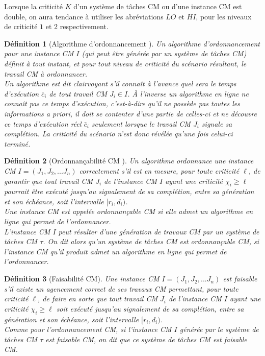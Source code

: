 \documentclass[12pt,a4paper,oneside]{book}
\theoremstyle{break}
\newtheorem{defin}{Définition}[chapter]
\theoremstyle{breakplain}
\begin{document}
Lorsque la criticité $K$ d'un système de tâches CM ou d'une instance CM est double, on aura tendance à utiliser les abréviations $LO$ et $HI$, pour les niveaux de criticité $1$ et $2$ respectivement.\\

\begin{defin}[Algorithme d'ordonnancement \cite{baruah2010towards}]
Un algorithme d'ordonnancement pour une instance CM $I$ (qui peut être générée par un système de tâches CM) définit à tout instant, et pour tout niveau de criticité du scénario résultant, le travail CM à ordonnancer.\\

Un algorithme est dit clairvoyant s'il connaît à l'avance quel sera le temps d'exécution $\bar{c}_i$ de tout travail CM $J_i \in I$. À l'inverse un algorithme en ligne ne connaît pas ce temps d'exécution, c'est-à-dire qu'il ne possède pas toutes les informations \textit{a priori}, il doit se contenter d'une partie de celles-ci et ne découvre ce temps d'exécution réel $\bar{c}_i$ seulement lorsque le travail CM $J_i$ signale sa complétion. La criticité du scénario n'est donc révélée qu'une fois celui-ci terminé.\\
\end{defin}

\begin{defin}[Ordonnançabilité CM \cite{BaruahBDMSS11}]
Un algorithme ordonnance une instance CM $I = (J_1, J_2, ... J_n)$ correctement s'il est en mesure, pour toute criticité $\ell$, de garantir que tout travail CM $J_i$ de l'instance CM $I$ ayant une criticité $\chi_i \geq \ell$ pourrait être exécuté jusqu'au signalement de sa complétion, entre sa génération et son échéance, soit l'intervalle $[r_i, d_i)$.\\ Une instance CM est appelée ordonnançable CM si elle admet un algorithme en ligne qui permet de l'ordonnancer.\\

L'instance CM $I$ peut résulter d'une génération de travaux CM par un système de tâches CM $\tau$. On dit alors qu'un système de tâches CM est ordonnançable CM, si l'instance CM qu'il produit admet un algorithme en ligne qui permet de l'ordonnancer.\\
\end{defin}

\begin{defin}[Faisabilité CM]
Une instance CM $I = (J_1, J_2, ... J_n)$ est faisable s'il existe un agencement correct de ses travaux CM permettant, pour toute criticité $\ell$, de faire en sorte que tout travail CM $J_i$ de l'instance CM $I$ ayant une criticité $\chi_i \geq \ell$ soit exécuté jusqu'au signalement de sa complétion, entre sa génération et son échéance, soit l'intervalle $[r_i, d_i)$.\\
Comme pour l'ordonnancement CM, si l'instance CM $I$ générée par le système de tâches CM $\tau$ est faisable CM, on dit que ce système de tâches CM est faisable CM.\\
\end{defin}
\end{document}
